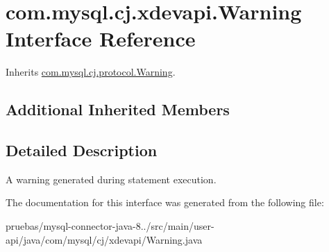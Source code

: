 \hypertarget{interfacecom_1_1mysql_1_1cj_1_1xdevapi_1_1_warning}{}\section{com.\+mysql.\+cj.\+xdevapi.\+Warning Interface Reference}
\label{interfacecom_1_1mysql_1_1cj_1_1xdevapi_1_1_warning}


Inherits \mbox{\hyperlink{interfacecom_1_1mysql_1_1cj_1_1protocol_1_1_warning}{com.\+mysql.\+cj.\+protocol.\+Warning}}.

\subsection*{Additional Inherited Members}


\subsection{Detailed Description}
A warning generated during statement execution. 

The documentation for this interface was generated from the following file\+:\begin{DoxyCompactItemize}
\item 
pruebas/mysql-\/connector-\/java-\/8../src/main/user-\/api/java/com/mysql/cj/xdevapi/Warning.\+java\end{DoxyCompactItemize}
